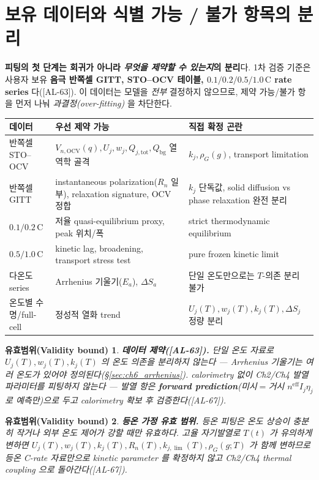 \documentclass[11pt,a4paper]{article}
\newtheorem*{boundbox}{유효범위(Validity bound)}
\newcommand{\eff}{\mathrm{eff}}
\newcommand{\bg}{\mathrm{bg}}
\newcommand{\OCV}{\mathrm{OCV}}
\newcommand{\tot}{\mathrm{tot}}
\newcommand{\AL}[1]{\textsf{[AL-#1]}}
\begin{document}
\section{보유 데이터와 식별 가능 / 불가 항목의 분리}\label{sec:ch6_data}
\textbf{피팅의 첫 단계는 회귀가 아니라 \emph{무엇을 제약할 수 있는지}의 분리}다. 1차 검증 기준은 사용자 보유
\textbf{음극 반쪽셀 GITT, STO--OCV 테이블, $0.1/0.2/0.5/1.0\,\mathrm{C}$ rate series} 다(\AL{63}). 이 데이터는
모델을 \emph{전부} 결정하지 않으므로, 제약 가능/불가 항을 먼저 나눠 \emph{과결정(over-fitting)} 을 차단한다.
\begin{longtable}{p{} p{} p{}}
\toprule 데이터 & 우선 제약 가능 & 직접 확정 곤란 \\ \midrule \endhead
반쪽셀 STO--OCV & $V_{n,\OCV}(q),U_j,w_j,Q_{j,\tot},Q_\bg$ 열역학 골격 & $k_j,\rho_G(g)$, transport limitation \\
반쪽셀 GITT & instantaneous polarization($R_n$ 일부), relaxation signature, OCV 정합 & $k_j$ 단독값, solid diffusion vs phase relaxation 완전 분리 \\
$0.1/0.2\,\mathrm C$ & 저율 quasi-equilibrium proxy, peak 위치/폭 & strict thermodynamic equilibrium \\
$0.5/1.0\,\mathrm C$ & kinetic lag, broadening, transport stress test & pure frozen kinetic limit \\
다온도 series & Arrhenius 기울기($E_a$), $\Delta S_a$ & 단일 온도만으로는 $T$-의존 분리 불가 \\
온도별 수명/full-cell & 정성적 열화 trend & $U_j(T),w_j(T),k_j(T),\Delta S_j$ 정량 분리 \\
\bottomrule
\end{longtable}
\begin{boundbox}
\textbf{데이터 제약(\AL{63}).} 단일 온도 자료로 $U_j(T),w_j(T),k_j(T)$ 의 온도 의존을 분리하지 않는다 — Arrhenius
기울기는 \emph{여러} 온도가 있어야 정의된다(\S\ref{sec:ch6_arrhenius}). calorimetry 없이 Ch2/Ch4 발열 파라미터를
피팅하지 않는다 — 발열 항은 \textbf{forward prediction}(미시$=$거시 $n^{\eff}I_j\eta_j$ 로 예측만)으로 두고
calorimetry 확보 후 검증한다(\AL{67}).
\end{boundbox}
\begin{boundbox}
\textbf{등온 가정 유효 범위.} 등온 피팅은 온도 상승이 충분히 작거나 외부 온도 제어가 강할 때만 유효하다. 고율
자기발열로 $T(t)$ 가 유의하게 변하면 $U_j(T),w_j(T),k_j(T),R_n(T),k_{j,\lim}(T),\rho_G(g;T)$ 가 함께 변하므로
등온 C-rate 자료만으로 kinetic parameter 를 확정하지 않고 Ch2/Ch4 thermal coupling 으로 돌아간다(\AL{67}).
\end{boundbox}
\end{document}
